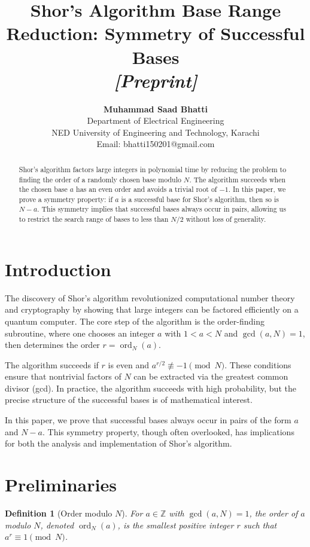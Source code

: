 \documentclass[12pt]{article}
\title{\textbf{Shor's Algorithm Base Range Reduction: Symmetry of Successful Bases} \\[0.5em]
\large \textit{[Preprint]}}
\author{\textbf{Muhammad Saad Bhatti} \\ 
Department of Electrical Engineering \\ 
NED University of Engineering and Technology, Karachi \\ 
Email: bhatti150201@gmail.com}
\date{}
\newtheorem{definition}{Definition}
\begin{document}
\maketitle

\begin{abstract}
Shor's algorithm factors large integers in polynomial time by reducing the problem to finding the order of a randomly chosen base modulo $N$. The algorithm succeeds when the chosen base $a$ has an even order and avoids a trivial root of $-1$. In this paper, we prove a symmetry property: if $a$ is a successful base for Shor's algorithm, then so is $N-a$. This symmetry implies that successful bases always occur in pairs, allowing us to restrict the search range of bases to less than $N/2$ without loss of generality. 
\end{abstract}


\section{Introduction}
The discovery of Shor's algorithm revolutionized computational number theory and cryptography by showing that large integers can be factored efficiently on a quantum computer. The core step of the algorithm is the order-finding subroutine, where one chooses an integer $a$ with $1<a<N$ and $\gcd(a,N)=1$, then determines the order $r=\operatorname{ord}_N(a)$.

The algorithm succeeds if $r$ is even and $a^{r/2} \not\equiv -1 \pmod{N}$. These conditions ensure that nontrivial factors of $N$ can be extracted via the greatest common divisor (gcd). In practice, the algorithm succeeds with high probability, but the precise structure of the successful bases is of mathematical interest.

In this paper, we prove that successful bases always occur in pairs of the form $a$ and $N-a$. This symmetry property, though often overlooked, has implications for both the analysis and implementation of Shor's algorithm.

\section{Preliminaries}

\begin{definition}[Order modulo $N$]
For $a \in \mathbb{Z}$ with $\gcd(a,N)=1$, the order of $a$ modulo $N$, denoted $\operatorname{ord}_N(a)$, is the smallest positive integer $r$ such that $a^r \equiv 1 \pmod N$.
\end{definition}
\end{document}
